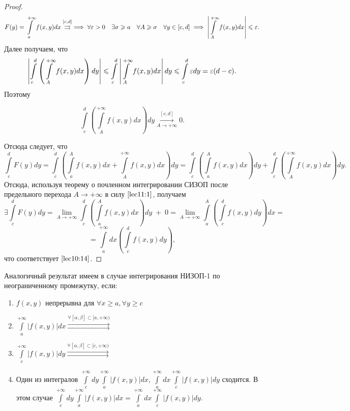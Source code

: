 \documentclass[../../main.tex]{subfiles}
\begin{document}
\begin{proof}
	\[F(y) = \int\limits_a^{+\infty} f(x, y)dx \overset{[c, d]}\rightrightarrows 
	\implies
	\forall \varepsilon > 0 \quad \exists \sigma \geqslant a \quad \forall A \geqslant \sigma 
	\quad \forall y \in [c, d] \implies \left|\int\limits_A^{+\infty}f(x, y) dx 
	\right| \leqslant \varepsilon.\]
	Далее получаем, что 
	\[ \left| \int\limits_c^d\left(\int\limits_A^{+\infty}f(x, y)dx\right) 
	dy\right| 
	\leqslant \int\limits_c^d\left|\int\limits_A^{+\infty}f(x, y)dx\right| dy
	\leqslant \int\limits_c^d \varepsilon dy = \varepsilon(d - c).\]
	Поэтому 
	
	\begin{equation} \label{lec11:1}
		\int\limits_c^d \left( \int\limits_A^{+\infty} f(x, y) dx \right) dy 
		\overset{[c, d]}{\underset{A \rightarrow +\infty}\longrightarrow} 0.
	\end{equation}
	
	Отсюда следует, что
	\[
	\int\limits_c^d F(y)dy = \int\limits_c^d \left( \int\limits_a^A f(x, y)dx + 
	\int\limits_A^{+\infty} f(x, y) dx \right) dy = \int\limits_c^d \left( 
	\int\limits_a^A f(x, y) dx \right) dy + \int\limits_c^d \left( 
	\int\limits_A^{+\infty} f(x, y) dx \right) dy.
	\]
	Отсюда, используя теорему о почленном интегрировании СИЗОП после предельного 
	перехода $A \longrightarrow +\infty$ в силу $\eqref{lec11:1}$, получаем 
	\[ \exists \int\limits_c^d F(y) dy = \lim_{A \rightarrow +\infty} 
	\int\limits_c^d \left( \int\limits_a^A f(x, y) dx \right) dy \; + \; 0 
	= \lim_{A \rightarrow +\infty} \int\limits_a^A \left( \int\limits_c^d f(x, y) 
	dy \right) dx = \]
	\[ = \int\limits_a^{+\infty} dx \left( \int\limits_c^d f(x, y) dy \right), \]
	 что соответствует $\eqref{lec10:14}$.
\end{proof}

\begin{rem}
	Аналогичный результат имеем в случае интегрирования НИЗОП-1 по 
	неограниченному промежутку, если:
	\begin{enumerate}
		\item $\displaystyle f(x, y)$ непрерывна для $\forall x \geq a, \forall y 
		\geq c$
		\item $\displaystyle \int\limits_a^{+\infty} \left| f(x, y) \right| dx 
		\overset{\forall [\alpha, \beta] \subset [a, +\infty) }\rightrightarrows$
		\item $\displaystyle \int\limits_c^{+\infty} \left| f(x, y) \right| dy 
		\overset{\forall [\alpha, \beta] \subset [c, +\infty) }\rightrightarrows$
		\item Один из интегралов $\displaystyle \int\limits_c^{+\infty} dy 
		\int\limits_a^{+\infty} \left|f(x, y)\right| dx,
		\int\limits_a^{+\infty} dx \int\limits_c^{+\infty} \left|f(x, y)\right| dy$
		сходится. В этом случае
		$\displaystyle \int\limits_c^{+\infty} dy \int\limits_a^{+\infty} \left|f(x, 
		y)\right| dx = \int\limits_a^{+\infty} dx \int\limits_c^{+\infty} \left|f(x, 
		y)\right| dy$.
	\end{enumerate}
\end{rem}
\end{document}
